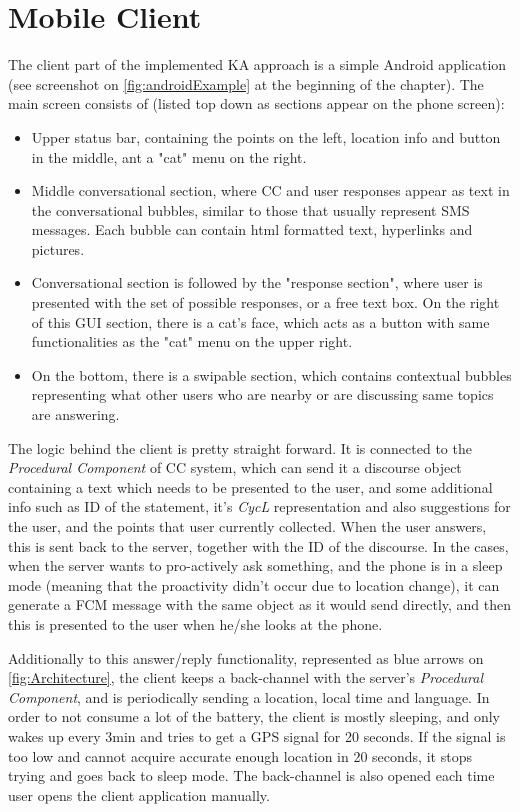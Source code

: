 \section{Mobile Client}
\label{section:app}
The client part of the implemented KA approach is a simple Android application
(see screenshot on \autoref{fig:androidExample} at the beginning of the chapter).
The main screen consists of (listed top down as sections appear on the phone 
screen):
\begin{itemize}
\item Upper status bar, containing the points on the left, location info and 
button in the middle, ant a "cat" menu on the right.
\item Middle conversational section, where CC and user responses appear as
text in the conversational bubbles, similar to those that usually represent 
SMS messages. Each bubble can contain html formatted text, hyperlinks and 
pictures.
\item Conversational section is followed by the "response section", where user
is presented with the set of possible responses, or a free text box. On the 
right of this GUI section, there is a cat's face, which acts as a button with
same functionalities as the "cat" menu on the upper right.
\item On the bottom, there is a swipable section, which contains contextual
bubbles representing what other users  who are nearby or are discussing same 
topics are answering.
\end{itemize} 

The logic behind the client is pretty straight forward. It is connected to the
\emph{Procedural Component} of CC system, which can send it a discourse object
containing a text which needs to be presented to the user, and some additional 
info such as ID of the statement, it's \emph{CycL} representation and also
suggestions for the user, and the points that user currently collected. When 
the user answers, this is sent back to the server, together with the ID of the 
discourse. In the cases, when the server wants to pro-actively ask something,
and the phone is in a sleep mode (meaning that the proactivity didn't occur due
to location change), it can generate a FCM message with the same object as
it would send directly, and then this is presented to the user when he/she 
looks at the phone.

Additionally to this answer/reply functionality, represented as blue arrows on
\autoref{fig:Architecture}, the client keeps a back-channel with the 
server's \emph{Procedural Component}, and is periodically sending a location,
local time and language. In order to not consume a lot of the battery, the 
client is mostly sleeping, and only wakes up every 3min and tries to get a GPS
signal for 20 seconds. If the signal is too low and cannot acquire accurate 
enough location in 20 seconds, it stops trying and goes back to sleep mode.
The back-channel is also opened each time user opens the client application
manually.

